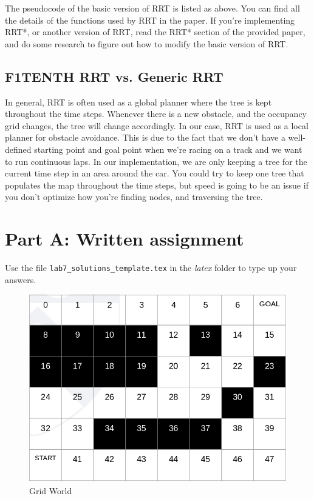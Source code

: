 \documentclass[letta4 paper]{article}
\numberwithin{equation}{section}
\newcommand{\0}{\mathbf{0}}
\begin{document}
	The pseudocode of the basic version of RRT is listed as above. You can find all the details of the functions used by RRT in the paper. If you're implementing RRT*, or another version of RRT, read the RRT* section of the provided paper, and do some research to figure out how to modify the basic version of RRT.
	\subsection{F1TENTH RRT vs. Generic RRT}
	In general, RRT is often used as a global planner where the tree is kept throughout the time steps. Whenever there is a new obstacle, and the occupancy grid changes, the tree will change accordingly. In our case, RRT is used as a local planner for obstacle avoidance. This is due to the fact that we don't have a well-defined starting point and goal point when we're racing on a track and we want to run continuous laps. In our implementation, we are only keeping a tree for the current time step in an area around the car. You could try to keep one tree that populates the map throughout the time steps, but speed is going to be an issue if you don't optimize how you're finding nodes, and traversing the tree.\\
	
	
	\newpage
	\section{Part A: Written assignment}
	Use the file \texttt{lab7\_solutions\_template.tex} in the \textit{latex} folder to type up your answers.
	\begin{figure}[!hb]
		\begin{center}
			\includegraphics[scale=0.4]{grid_world.png}
		\end{center}
		\caption{Grid World}
		\label{fig:gridworld}
	\end{figure}
\end{document}

